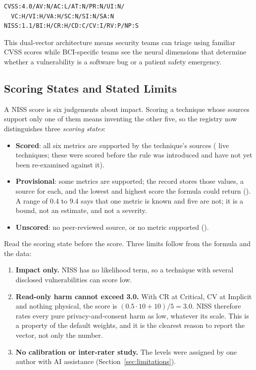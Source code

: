 \begin{lstlisting}
CVSS:4.0/AV:N/AC:L/AT:N/PR:N/UI:N/
  VC:H/VI:H/VA:H/SC:N/SI:N/SA:N
NISS:1.1/BI:H/CR:H/CD:C/CV:I/RV:P/NP:S
\end{lstlisting}

This dual-vector architecture means security teams can triage using familiar CVSS
scores while BCI-specific teams see the neural dimensions that determine whether a
vulnerability is a software bug or a patient safety emergency.

\subsection{Scoring States and Stated Limits}
\label{sec:niss-limits}

A NISS score is six judgements about impact. Scoring a technique whose sources support only
one of them means inventing the other five, so the registry now distinguishes three
\emph{scoring states}:

\begin{itemize}
  \item \textbf{Scored}: all six metrics are supported by the technique's sources
        (\LiveNissScored{} live techniques; these were scored before the rule was
        introduced and have not yet been re-examined against it).
  \item \textbf{Provisional}: some metrics are supported; the record stores those
        values, a source for each, and the lowest and highest score the formula could
        return (\LiveNissProvisional{}). A range of 0.4 to 9.4 says that one metric is
        known and five are not; it is a bound, not an estimate, and not a severity.
  \item \textbf{Unscored}: no peer-reviewed source, or no metric supported
        (\LiveNissUnscored{}).
\end{itemize}

\noindent Read the scoring state before the score. Three limits follow from the formula and
the data:

\begin{enumerate}
  \item \textbf{Impact only.} NISS has no likelihood term, so a technique with several
        disclosed vulnerabilities can score low.
  \item \textbf{Read-only harm cannot exceed 3.0.} With CR at Critical, CV at Implicit
        and nothing physical, the score is $(0.5 \cdot 10 + 10)/5 = 3.0$. NISS therefore
        rates every pure privacy-and-consent harm as low, whatever its scale. This is a
        property of the default weights, and it is the clearest reason to report the
        vector, not only the number.
  \item \textbf{No calibration or inter-rater study.} The levels were assigned by one
        author with AI assistance (Section~\ref{sec:limitations}).
\end{enumerate}

